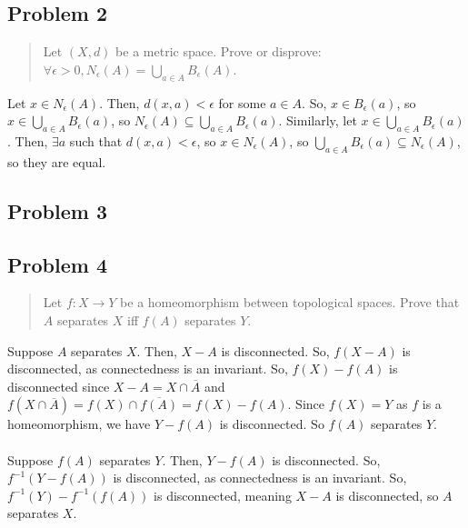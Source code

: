 \documentclass[8pt]{extarticle}
\begin{document}
{\subsection*{Problem 2}
\begin{quote}
	Let $(X,d)$ be a metric space. Prove or disprove: $\forall \epsilon>0, N_{\epsilon}(A) = \bigcup_{a\in A}B_{\epsilon}(A)$.
\end{quote}
Let $x\in N_{\epsilon}(A)$. Then, $d(x,a)<\epsilon$ for some $a\in A$. So, $x\in B_{\epsilon}(a)$, so $x\in \bigcup_{a\in A}B_{\epsilon}(a)$, so $N_{\epsilon}(A)\subseteq \bigcup_{a\in A}B_{\epsilon}(a)$. Similarly, let $x\in \bigcup_{a\in A}B_{\epsilon}(a)$. Then, $\exists a$ such that $d(x,a)<\epsilon$, so $x\in N_{\epsilon}(A)$, so $\bigcup_{a\in A}B_{\epsilon}(a)\subseteq N_{\epsilon}(A)$, so they are equal.
\subsection*{Problem 3}
\subsection*{Problem 4}
\begin{quote}
	Let $f:X\rightarrow Y$ be a homeomorphism between topological spaces. Prove that $A$ separates $X$ iff $f(A)$ separates $Y$.
\end{quote}
Suppose $A$ separates $X$. Then, $X-A$ is disconnected. So, $f(X-A)$ is disconnected, as connectedness is an invariant. So, $f(X)-f(A)$ is disconnected since $X-A = X\cap \overline{A}$ and $f(X\cap\overline{A}) = f(X)\cap\overline{f(A)} = f(X) - f(A)$. Since $f(X) = Y$ as $f$ is a homeomorphism, we have $Y-f(A)$ is disconnected. So $f(A)$ separates $Y$.\\
\\
Suppose $f(A)$ separates $Y$. Then, $Y-f(A)$ is disconnected. So, $f^{-1}(Y-f(A))$ is disconnected, as connectedness is an invariant. So, $f^{-1}(Y) - f^{-1}(f(A))$ is disconnected, meaning $X-A$ is disconnected, so $A$ separates $X$.
}
\end{document}
